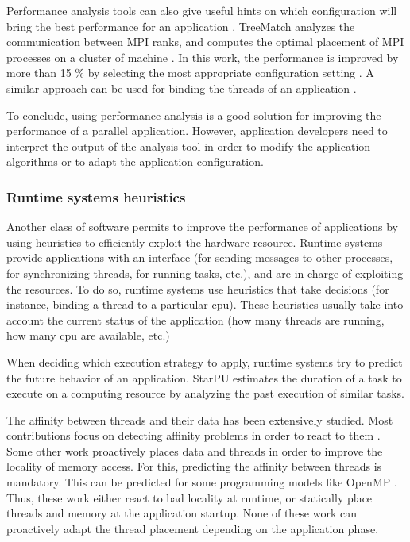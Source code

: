 \documentclass[a4paper,11pt,defblank]{article}
\begin{document}
Performance analysis tools can also give useful hints on which
configuration will bring the best performance for an application
\cite{xray}. TreeMatch analyzes the communication between MPI ranks,
and computes the optimal placement of MPI processes on a cluster of
machine \cite{jeannot2010near}. In this work, the performance is
improved by more than 15 \% by selecting the most appropriate
configuration setting \cite{treematch}.  A similar approach can be
used for binding the threads of an application
\cite{castro2011machine}.

To conclude, using performance analysis is a good solution for improving the
performance of a parallel application. However, application developers
need to interpret the output of the analysis tool in order to modify
the application algorithms or to adapt the application configuration.

\vspace{0.5cm}
\subsubsection{Runtime systems heuristics}

Another class of software permits to improve the performance of
applications by using heuristics to efficiently exploit the hardware
resource. Runtime systems provide applications with an interface (for
sending messages to other processes, for synchronizing threads, for
running tasks, etc.), and are in charge of exploiting the
resources. To do so, runtime systems use heuristics that take
decisions (for instance, binding a thread to a particular cpu). These
heuristics usually take into account the current status of the
application (how many threads are running, how many cpu are available,
etc.)

When deciding which execution strategy to apply, runtime systems try
to predict the future behavior of an application. StarPU estimates
the duration of a task to execute on a computing resource by
analyzing the past execution of similar tasks\cite{starpu}.


The affinity between threads and their data has been extensively
studied. Most contributions focus on detecting affinity problems in order to
react to them \cite{carrefour, diener2014kmaf}. Some other work
proactively places data and threads in order to improve the locality of
memory access. For this, predicting the affinity between threads is
mandatory. This can be predicted for some programming models like
OpenMP \cite{forestgomp}. Thus, these work either react to bad
locality at runtime, or statically place threads and memory at the
application startup. None of these work can proactively adapt the
thread placement depending on the application phase.
\end{document}
